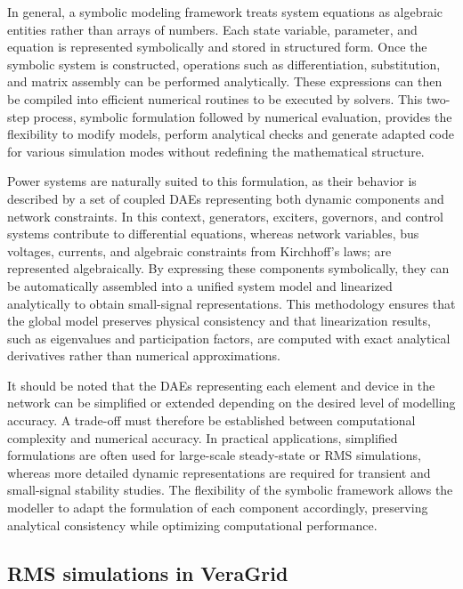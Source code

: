 In general, a symbolic modeling framework treats system equations as algebraic entities rather than arrays of numbers. Each state variable, parameter, and equation
is represented symbolically and stored in structured form. Once the symbolic system is constructed, operations such as differentiation, substitution, and matrix assembly
can be performed analytically. These expressions can then be compiled into efficient numerical routines to be executed by solvers. 
This two-step process, symbolic formulation followed by numerical evaluation, provides the flexibility to modify models, perform analytical checks
and generate adapted code for various simulation modes without redefining the mathematical structure.

Power systems are naturally suited to this formulation, as their behavior is described by a set of coupled DAEs representing both dynamic components and network constraints.
In this context, generators, exciters, governors, and control systems contribute to differential equations, whereas network variables, bus voltages, currents, and algebraic 
constraints from Kirchhoff's laws; are represented algebraically. By expressing these components symbolically, they can be automatically assembled into a unified 
system model and linearized analytically to obtain small-signal representations. This methodology ensures that the global model preserves physical consistency and that 
linearization results, such as eigenvalues and participation factors, are computed with exact analytical derivatives rather than numerical approximations.

It should be noted that the DAEs representing each element and device in the network can be simplified or extended depending on the desired level of modelling accuracy. 
A trade-off must therefore be established between computational complexity and numerical accuracy. In practical applications, simplified formulations are often used for 
large-scale steady-state or RMS simulations, whereas more detailed dynamic representations are required for transient and small-signal stability studies. The flexibility 
of the symbolic framework allows the modeller to adapt the formulation of each component accordingly, preserving analytical consistency while optimizing computational 
performance.

\subsection{RMS simulations in VeraGrid}


